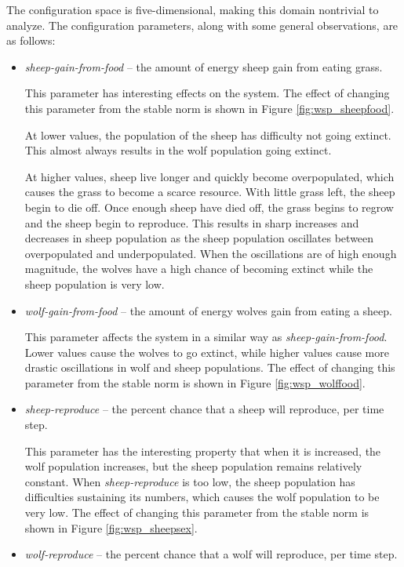 The configuration space is five-dimensional, making this domain nontrivial to analyze.
The configuration parameters, along with some general observations, are as follows:
\begin{itemize}
   \item \textit{sheep-gain-from-food} -- the amount of energy sheep gain from eating grass.

This parameter has interesting effects on the system.
The effect of changing this parameter from the stable norm is shown in Figure \ref{fig:wsp_sheepfood}.

At lower values, the population of the sheep has difficulty not going extinct.
This almost always results in the wolf population going extinct.

At higher values, sheep live longer and quickly become overpopulated, which causes the grass to become a scarce resource.
With little grass left, the sheep begin to die off.
Once enough sheep have died off, the grass begins to regrow and the sheep begin to reproduce.
This results in sharp increases and decreases in sheep population as the sheep population oscillates between overpopulated and underpopulated.
When the oscillations are of high enough magnitude, the wolves have a high chance of becoming extinct while the 
sheep population is very low.


   \item \textit{wolf-gain-from-food} -- the amount of energy wolves gain from eating a sheep.

This parameter affects the system in a similar way as \textit{sheep-gain-from-food}.
Lower values cause the wolves to go extinct, while higher values cause more drastic oscillations in wolf and sheep populations.
The effect of changing this parameter from the stable norm is  shown in Figure \ref{fig:wsp_wolffood}.

   \item \textit{sheep-reproduce} -- the percent chance that a sheep will reproduce, per time step.

This parameter has the interesting property that when it is increased, the wolf population increases, but the sheep population remains relatively constant.
When \textit{sheep-reproduce} is too low, the sheep population has difficulties sustaining its numbers, which causes the wolf population to be very low.
The effect of changing this parameter from the stable norm is  shown in Figure \ref{fig:wsp_sheepsex}.

   \item \textit{wolf-reproduce} -- the percent chance that a wolf will reproduce, per time step.


\end{itemize}
